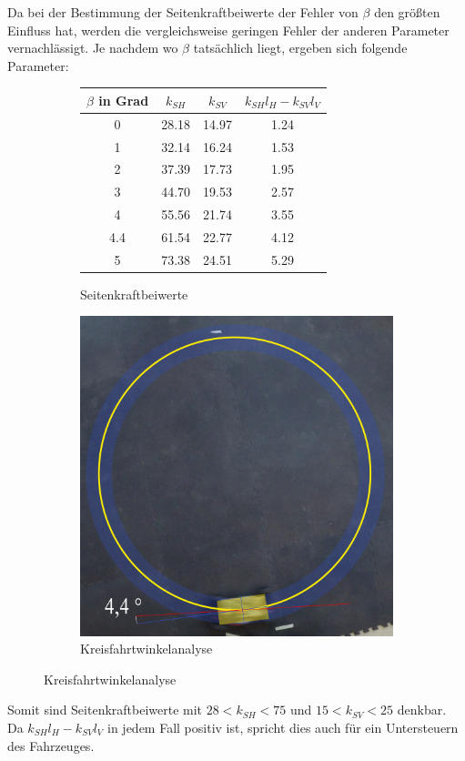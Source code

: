 Da bei der Bestimmung der Seitenkraftbeiwerte der Fehler von $\beta$ den größten Einfluss hat, werden die vergleichsweise geringen Fehler der anderen Parameter vernachlässigt. Je nachdem wo $\beta$ tatsächlich liegt, ergeben sich folgende Parameter:

\begin{center}
\begin{figure}[h]
\begin{subfigure}{.5\textwidth}
	\centering
	\begin{tabular}{|c|c|c|c|}
\hline
$\beta$ in Grad & $k_{SH}$& $k_{SV}$&$k_{SH}l_H-k_{SV}l_V$ \\\hline

0  & 28.18 & 14.97&1.24\\\hline
1  & 32.14 & 16.24&1.53\\\hline
2  & 37.39 & 17.73&1.95\\\hline
3  & 44.70 & 19.53&2.57\\\hline
4  & 55.56 & 21.74&3.55\\\hline
4.4  & 61.54 & 22.77&4.12\\\hline
5  & 73.38 & 24.51&5.29\\\hline

\end{tabular}
	\caption{Seitenkraftbeiwerte}
	\label{fig:Seitenkraftbeiwerte}
\end{subfigure}
\begin{subfigure}{.4\textwidth}
	\centering
	\includegraphics[scale=0.07]{Figures/Schwimmwinkel.png}
	\caption{Kreisfahrtwinkelanalyse}
	\label{fig:Kreis}
\end{subfigure}
\end{figure}
\end{center}\vspace{-0.7cm}
Somit sind Seitenkraftbeiwerte mit $28<k_{SH}<75$ und $15<k_{SV}<25$ denkbar. Da $k_{SH}l_H-k_{SV}l_V$ in jedem Fall positiv ist, spricht dies auch für ein Untersteuern des Fahrzeuges.

